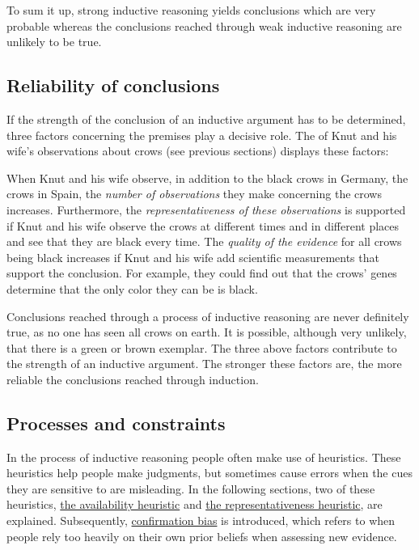 \documentclass[
]{krantz}
\begin{document}
To sum it up, strong inductive reasoning yields conclusions which are very probable whereas the conclusions reached through weak inductive reasoning are unlikely to be true.

\hypertarget{reliability-of-conclusions}{%
\subsection*{Reliability of conclusions}\label{reliability-of-conclusions}}


If the strength of the conclusion of an inductive argument has to be determined, three factors concerning the premises play a decisive role. The of Knut and his wife's observations about crows (see previous sections) displays these factors:

When Knut and his wife observe, in addition to the black crows in Germany, the crows in Spain, the \emph{number of observations} they make concerning the crows increases. Furthermore, the \emph{representativeness of these observations} is supported if Knut and his wife observe the crows at different times and in different places and see that they are black every time. The \emph{quality of the evidence} for all crows being black increases if Knut and his wife add scientific measurements that support the conclusion. For example, they could find out that the crows' genes determine that the only color they can be is black.

Conclusions reached through a process of inductive reasoning are never definitely true, as no one has seen all crows on earth. It is possible, although very unlikely, that there is a green or brown exemplar. The three above factors contribute to the strength of an inductive argument. The stronger these factors are, the more reliable the conclusions reached through induction.

\hypertarget{processes-and-constraints}{%
\subsection*{Processes and constraints}\label{processes-and-constraints}}


In the process of inductive reasoning people often make use of heuristics. These heuristics help people make judgments, but sometimes cause errors when the cues they are sensitive to are misleading. In the following sections, two of these heuristics, \protect\hyperlink{the-availability-heuristic}{the availability heuristic} and \protect\hyperlink{the-representativeness-heuristic}{the representativeness heuristic}, are explained. Subsequently, \protect\hyperlink{confirmation-bias}{confirmation bias} is introduced, which refers to when people rely too heavily on their own prior beliefs when assessing new evidence.
\end{document}
